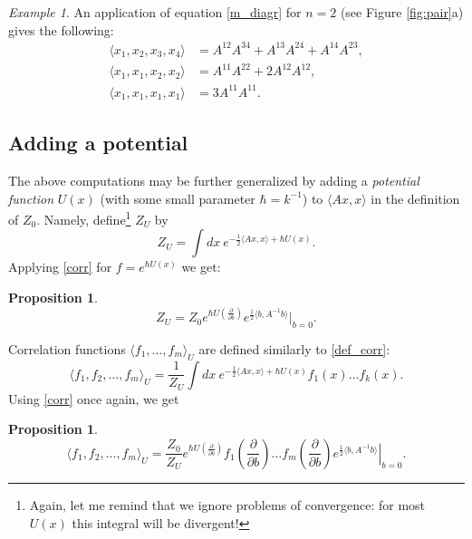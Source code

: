 \documentclass[10pt]{amsart}
\newtheorem{prop}[thm]{Proposition}
\theoremstyle{definition}
\theoremstyle{remark}
\newtheorem{ex}[thm]{Example}
\newcommand{\dd}{\partial}
\def\<{\langle}
\def\>{\rangle}
\newcommand{\h}{\hbar}
\begin{document}
\begin{ex}\label{4_point}
An application of equation \eqref{m_diagr} for $n=2$ (see Figure
\ref{fig:pair}a) gives the following:
$$\begin{aligned}
\<x_1,x_2,x_3,x_4\>&=A^{12}A^{34}+A^{13}A^{24}+ A^{14}A^{23},\\
\<x_1,x_1,x_2,x_2\>&=A^{11}A^{22}+2A^{12}A^{12},\\
\<x_1,x_1,x_1,x_1\>&=3A^{11}A^{11}.
\end{aligned}$$
%
\end{ex}

\subsection{Adding a potential}
The above computations may be further generalized by adding a {\em
potential function} $U(x)$ (with some small parameter $\h=k^{-1}$)
to $\<Ax,x\>$ in the definition of $Z_0$.
Namely, define\footnote{Again, let me remind that we ignore problems
of convergence: for most $U(x)$ this integral will be divergent!}
$Z_U$ by
\begin{equation}\label{def_Z_U}
Z_U=\int dx\ e^{-\frac12\<Ax,x\>+\h U(x)}.
\end{equation}
Applying \eqref{corr} for $f=e^{\h U(x)}$ we get:

\begin{prop}
\begin{equation}\label{Z_U}
Z_U=Z_0 e^{\h U(\frac\dd{\dd
b})}e^{\frac12\<b,A^{-1}b\>}\big|_{b=0}.
\end{equation}
\end{prop}

Correlation functions $\<f_1,\dots,f_m\>_U$ are defined similarly
to \eqref{def_corr}:
\begin{equation}\label{def_corr_U}
\<f_1,f_2,\dots,f_m\>_U=\frac1{Z_U}\int dx\ e^{-\frac12\<Ax,x\>+\h
U(x)} f_1(x)\dots f_k(x).
\end{equation}
Using \eqref{corr} once again, we get

\begin{prop}
\begin{equation}\label{corr_U}
\<f_1,f_2,\dots,f_m\>_U=\frac{Z_0}{Z_U} e^{\h U(\frac\dd{\dd b})}
   f_1\left(\frac\dd{\dd b}\right)\dots f_m\left(\frac\dd{\dd b}\right)
           \left.  e^{\frac12\<b,A^{-1}b\>}\right|_{b=0}.
\end{equation}
\end{prop}
\end{document}
